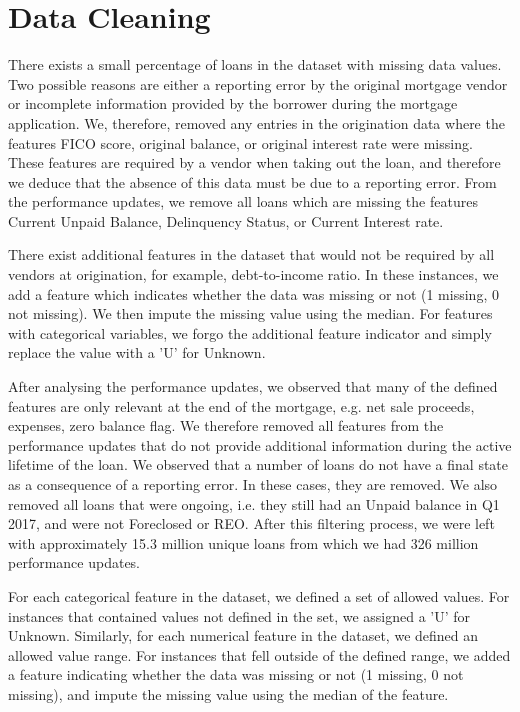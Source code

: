     

    \section{Data Cleaning}\label{data_cleaning}
        There exists a small percentage of loans in the dataset with missing data values. Two possible reasons are either a reporting error by the original mortgage vendor or incomplete information provided by the borrower during the mortgage application. We, therefore, removed any entries in the origination data where the features FICO score, original balance, or original interest rate were missing. These features are required by a vendor when taking out the loan, and therefore we deduce that the absence of this data must be due to a reporting error. From the performance updates, we remove all loans which are missing the features Current Unpaid Balance, Delinquency Status, or Current Interest rate. 
        
        There exist additional features in the dataset that would not be required by all vendors at origination, for example, debt-to-income ratio. In these instances, we add a feature which indicates whether the data was missing or not (1 missing, 0 not missing). We then impute the missing value using the median. For features with categorical variables, we forgo the additional feature indicator and simply replace the value with a 'U' for Unknown. 
        
        After analysing the performance updates, we observed that many of the defined features are only relevant at the end of the mortgage, e.g. net sale proceeds, expenses, zero balance flag. We therefore removed all features from the performance updates that do not provide additional information during the active lifetime of the loan. We observed that a number of loans do not have a final state as a consequence of a reporting error. In these cases, they are removed. We also removed all loans that were ongoing, i.e. they still had an Unpaid balance in Q1 2017, and were not Foreclosed or REO. After this filtering process, we were left with approximately 15.3 million unique loans from which we had 326 million performance updates.
        
        For each categorical feature in the dataset, we defined a set of allowed values. For instances that contained values not defined in the set, we assigned a 'U' for Unknown. Similarly, for each numerical feature in the dataset, we defined an allowed value range. For instances that fell outside of the defined range, we added a feature indicating whether the data was missing or not (1 missing, 0 not missing), and impute the missing value using the median of the feature.
        


